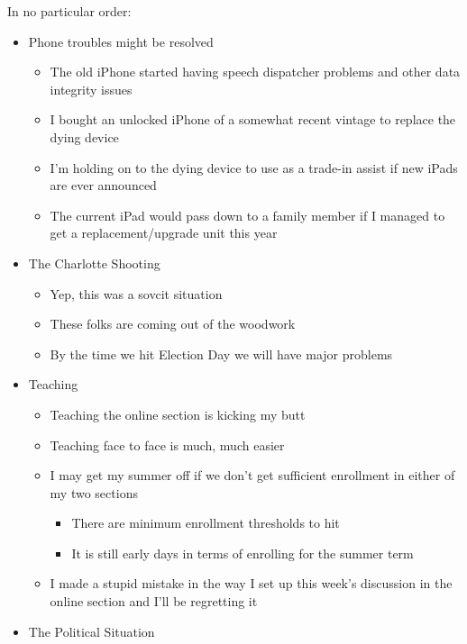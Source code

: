 In no particular order:

\begin{itemize}
\tightlist
\item
  Phone troubles might be resolved

  \begin{itemize}
  \tightlist
  \item
    The old iPhone started having speech dispatcher problems and other
    data integrity issues
  \item
    I bought an unlocked iPhone of a somewhat recent vintage to replace
    the dying device
  \item
    I'm holding on to the dying device to use as a trade-in assist if
    new iPads are ever announced
  \item
    The current iPad would pass down to a family member if I managed to
    get a replacement/upgrade unit this year
  \end{itemize}
\item
  The Charlotte Shooting

  \begin{itemize}
  \tightlist
  \item
    Yep, this was a sovcit situation
  \item
    These folks are coming out of the woodwork
  \item
    By the time we hit Election Day we will have major problems
  \end{itemize}
\item
  Teaching

  \begin{itemize}
  \tightlist
  \item
    Teaching the online section is kicking my butt
  \item
    Teaching face to face is much, much easier
  \item
    I may get my summer off if we don't get sufficient enrollment in
    either of my two sections

    \begin{itemize}
    \tightlist
    \item
      There are minimum enrollment thresholds to hit
    \item
      It is still early days in terms of enrolling for the summer term
    \end{itemize}
  \item
    I made a stupid mistake in the way I set up this week's discussion
    in the online section and I'll be regretting it
  \end{itemize}
\item
  The Political Situation


\end{itemize}
